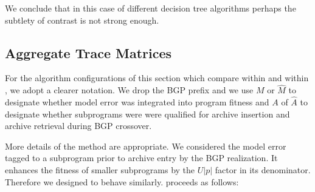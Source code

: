 %
%
%
%
%
%
We conclude that in this case of different decision tree algorithms perhaps the subtlety of contrast is not strong enough.  

\subsection{Aggregate Trace Matrices}\label{sect:agg-features}
For the algorithm configurations of this section which compare within \FULL and within \DRAW, we adopt a clearer notation. We drop the BGP prefix and we use $M$ or $\hat M$ to designate whether model error was integrated into program fitness and $A$ of $\hat A$ to designate whether subprograms were were qualified for archive insertion and archive retrieval during BGP crossover.

More details of the \DRAW method are appropriate.  We considered the model error tagged to a subprogram prior to archive entry by the BGP realization. It enhances the fitness of smaller subprograms by the $U|p|$ factor in its denominator. Therefore we designed \DRAW to behave similarly.  \DRAW proceeds as follows:


